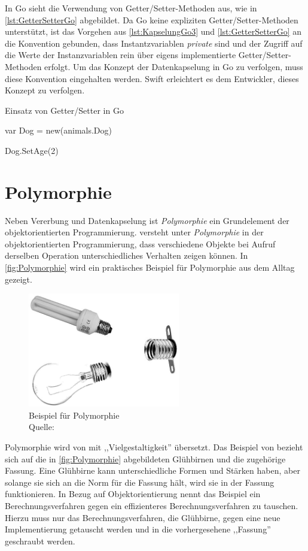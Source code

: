 In Go sieht die Verwendung von Getter/Setter-Methoden aus, wie in \autoref{lst:GetterSetterGo} abgebildet.
Da Go keine expliziten Getter/Setter-Methoden unterstützt, ist das Vorgehen aus \autoref{lst:KapselungGo3} und \autoref{lst:GetterSetterGo} an die Konvention gebunden, dass Instantzvariablen \textit{private} sind und der Zugriff auf die Werte der Instanzvariablen rein über eigens implementierte Getter/Setter-Methoden erfolgt.
Um das Konzept der Datenkapselung in Go zu verfolgen, muss diese Konvention eingehalten werden.
Swift erleichtert es dem Entwickler, dieses Konzept zu verfolgen.

\begin{listing}[H]
\caption{Einsatz von Getter/Setter in Go}
\label{lst:GetterSetterGo}
\begin{GoCode}
var Dog = new(animals.Dog)

Dog.SetAge(2)
\end{GoCode}
\end{listing}

\section{Polymorphie}
Neben Vererbung und Datenkapselung ist \textit{Polymorphie} ein Grundelement der objektorientierten Programmierung.
\cite[]{Lahres.2011} versteht unter \textit{Polymorphie} in der objektorientierten Programmierung, dass verschiedene Objekte bei Aufruf derselben Operation unterschiedliches Verhalten zeigen können. 
In \autoref{fig:Polymorphie} wird ein praktisches Beispiel für Polymorphie aus dem Alltag gezeigt. 

\begin{figure}[H]
    \centering
    \includegraphics[height=5cm]{Images/Polymorphie}
    \caption{Beispiel für Polymorphie \\ Quelle:\cite[]{Lahres.2011}}
    \label{fig:Polymorphie}
\end{figure}

Polymorphie wird von \cite[]{Lahres.2011} mit ,,Vielgestaltigkeit'' übersetzt. Das Beispiel von \cite[]{Lahres.2011} bezieht sich auf die in \autoref{fig:Polymorphie} abgebildeten Glühbirnen und die zugehörige Fassung. 
Eine Glühbirne kann unterschiedliche Formen und Stärken haben, aber solange sie sich an die Norm für die Fassung hält, wird sie in der Fassung funktionieren. 
In Bezug auf Objektorientierung nennt \cite[]{Lahres.2011} das Beispiel ein Berechnungsverfahren gegen ein effizienteres Berechnungsverfahren zu tauschen. 
Hierzu muss nur das Berechnungsverfahren, die Glühbirne, gegen eine neue Implementierung getauscht werden und in die vorhergesehene ,,Fassung'' geschraubt werden.

